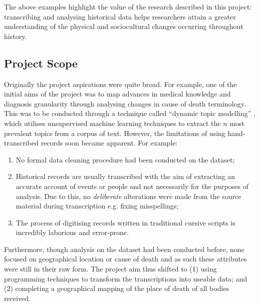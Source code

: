 The above examples highlight the value of the research described in this project: transcribing and analysing historical data helps researchers attain a greater understanding of the physical and sociocultural changes occurring throughout history.

\subsection{Project Scope}

Originally the project aspirations were quite broad. For example, one of the initial aims of the project was to map advances in medical knowledge and diagnosis granularity through analysing changes in cause of death terminology. This was to be conducted through a technique called ``dynamic topic modelling'' \parencite{blei_2006_dtm}, which utilises unsupervised machine learning techniques to extract the $n$ most prevalent topics from a corpus of text. However, the limitations of using hand-transcribed records soon became apparent. For example:

\begin{enumerate}
    \item No formal data cleaning procedure had been conducted on the dataset;
    \item Historical records are usually transcribed with the aim of extracting an accurate account of events or people and not necessarily for the purposes of analysis. Due to this, no \textit{deliberate} alterations were made from the source material during transcription e.g. fixing misspellings;
    \item The process of digitising records written in traditional cursive scripts is incredibly laborious and error-prone.
\end{enumerate}

Furthermore, though analysis on the dataset had been conducted before, none focused on geographical location or cause of death and as such these attributes were still in their raw form. The project aim thus shifted to (1) using programming techniques to transform the transcriptions into useable data; and (2) completing a geographical mapping of the place of death of all bodies received.